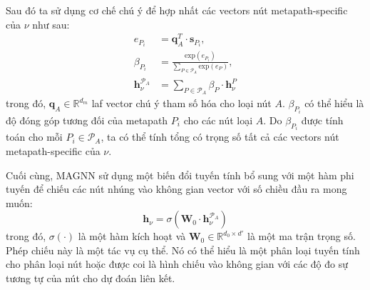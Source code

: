Sau đó ta sử dụng cơ chế chú ý để  hợp nhất các vectors nút metapath-specific của $\nu$ như sau:
\begin{equation}
  \begin{split}
    e_{P_i} &= \mathbf{q}^T_A \cdot \mathbf{s}_{P_i}, \\
    \beta _{P_i} &= \frac{\text{exp}(e_{P_i})}{\sum_{P \in \pmb{\mathcal{P}}_A} \text{exp}(e_{P})}, \\
    \mathbf{h}^{\pmb{\mathcal{P}}_A}_{\nu} &= \sum_{P \in \pmb{\mathcal{P}}_A} \beta _{P} \cdot \mathbf{h}^P_{\nu}
  \end{split}
\end{equation}
trong đó, $\mathbf{q}_A \in \mathbb{R}^{d_m}$ laf vector chú ý tham số hóa cho loại nút $A$. $\beta _{P_i}$ có thể hiểu là độ đóng góp tương đối của metapath $P_i$ cho các nút loại $A$. Do $\beta _{P_i}$ được tính toán cho mỗi $P_i \in \pmb{\mathcal{P}}_A$, ta có thể tính tổng có trọng số tất cả các vectors nút metapath-specific của $\nu$.

Cuối cùng, MAGNN sử dụng một biến đổi tuyến tính bổ sung với một hàm phi tuyến để chiếu các nút nhúng vào không gian vector với số chiều đầu ra mong muốn:
\begin{equation}
  \mathbf{h}_{\nu} = \sigma \left( \mathbf{W}_0 \cdot \mathbf{h}^{\pmb{\mathcal{P}}_A}_{\nu} \right)
\end{equation}
trong đó, $\sigma (\cdot)$ là một hàm kích hoạt và $\mathbf{W}_0 \in \mathbb{R}^{d_0 \times d'}$ là một ma trận trọng số. Phép chiếu này là một tác vụ cụ thể. Nó có thể hiểu là một phân loại tuyến tính cho phân loại nút hoặc được coi là hình chiếu vào không gian với các độ đo sự tương tự của nút cho dự đoán liên kết. 